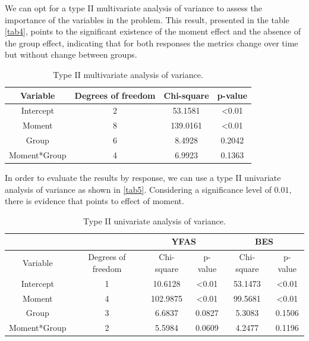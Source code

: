 \documentclass[AMA,STIX1COL]{WileyNJD-v2}
\begin{document}
We can opt for a type II multivariate analysis of variance to assess the importance of the variables in the problem. This result, presented in the table \autoref{tab4}, points to the significant existence of the moment effect and the absence of the group effect, indicating that for both responses the metrics change over time but without change between groups.

\begin{table}[h]
\centering
\begin{tabular}{cccc}
\hline
Variable      & Degrees of freedom & Chi-square   & p-value        \\ \hline
Intercept     & 2                  & 53.1581      & \textless 0.01 \\
Moment        & 8                  & 139.0161     & \textless 0.01 \\
Group         & 6                  & 8.4928       & 0.2042         \\
Moment*Group  & 4                  & 6.9923       & 0.1363         \\ \hline
\end{tabular}
\caption{Type II multivariate analysis of variance.}
\label{tab4}
\end{table}

In order to evaluate the results by response, we can use a type II univariate analysis of variance as shown in \autoref{tab5}. Considering a significance level of $0.01$, there is evidence that points to effect of moment.

\begin{table}[h]
\centering
\begin{tabular}{c|c|cc|cc}
\hline
              &                    & \multicolumn{2}{c|}{YFAS}     & \multicolumn{2}{c}{BES}       \\ \hline
Variable      & Degrees of freedom & Chi-square   & p-value        & Chi-square   & p-value        \\ \hline
Intercept     & 1                  & 10.6128      & \textless 0.01 & 53.1473      & \textless 0.01 \\
Moment        & 4                  & 102.9875     & \textless 0.01 & 99.5681      & \textless 0.01 \\
Group         & 3                  & 6.6837       & 0.0827         & 5.3083       & 0.1506         \\
Moment*Group  & 2                  & 5.5984       & 0.0609         & 4.2477       & 0.1196         \\ \hline
\end{tabular}
\caption{Type II univariate analysis of variance.}
\label{tab5}
\end{table}
\end{document}
